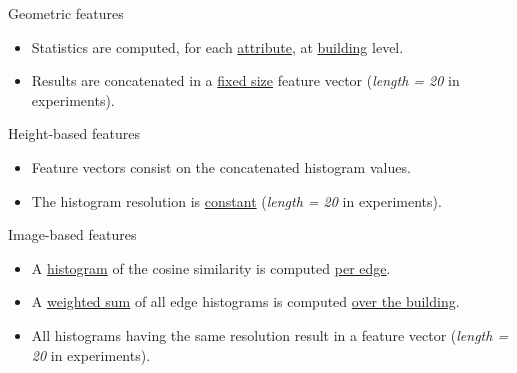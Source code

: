 \documentclass[10pt, export]{beamer}
\begin{document}
    \begin{frame}{Geometric features}
        \begin{figure}
            
        \end{figure}
        \begin{itemize}[label=$\blacktriangleright$, font=\color{IGNGreen}]
            \item \footnotesize Statistics are computed, for each \underline{attribute}, at \underline{building} level.
            \item \footnotesize Results are concatenated in a \underline{fixed size} feature vector (\textit{length = 20} in experiments).
        \end{itemize}
    \end{frame}
    \begin{frame}{Height-based features}
        \begin{figure}
            
        \end{figure}
        \begin{itemize}[label=$\blacktriangleright$, font=\color{IGNGreen}]
            \item \footnotesize Feature vectors consist on the concatenated histogram values.
            \item \footnotesize The histogram resolution is \underline{constant} (\textit{length = 20} in experiments).
        \end{itemize}
    \end{frame}
    \begin{frame}{Image-based features}
        \begin{figure}
            \begin{center}
                
            \end{center}
        \end{figure}
        \begin{itemize}[label=$\blacktriangleright$, font=\color{IGNGreen}]
            \item \footnotesize A \underline{histogram} of the cosine similarity is computed \underline{per edge}.
            \item \footnotesize A \underline{weighted sum} of all edge histograms is computed \underline{over the building}.
            \item \footnotesize All histograms having the same resolution result in a feature vector (\textit{length = 20} in experiments).
        \end{itemize}
    \end{frame}
\end{document}

